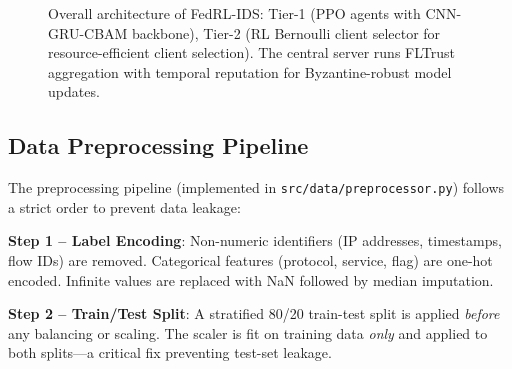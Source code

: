 \documentclass[conference]{IEEEtran}
\begin{document}
\begin{figure}[t]
{
}
\caption{Overall architecture of FedRL-IDS: Tier-1 (PPO agents with CNN-GRU-CBAM backbone), Tier-2 (RL Bernoulli client selector for resource-efficient client selection). The central server runs FLTrust aggregation with temporal reputation for Byzantine-robust model updates.}
\label{fig:architecture}
\end{figure}

\subsection{Data Preprocessing Pipeline}
\label{sec:preprocessing}

The preprocessing pipeline (implemented in \texttt{src/data/preprocessor.py}) follows a strict order to prevent data leakage:

\textbf{Step 1 -- Label Encoding}: Non-numeric identifiers (IP addresses, timestamps, flow IDs) are removed. Categorical features (protocol, service, flag) are one-hot encoded. Infinite values are replaced with NaN followed by median imputation.

\textbf{Step 2 -- Train/Test Split}: A stratified 80/20 train-test split is applied \emph{before} any balancing or scaling. The scaler is fit on training data \emph{only} and applied to both splits---a critical fix preventing test-set leakage.
\end{document}
